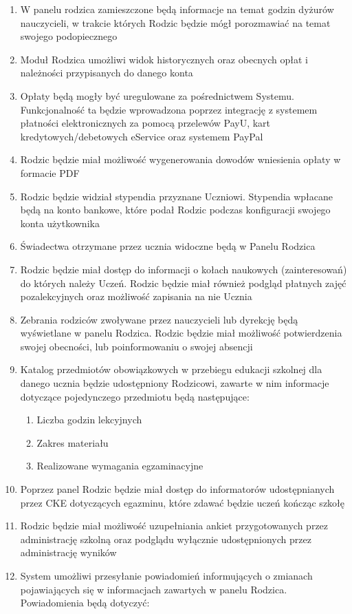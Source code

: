 \documentclass{article}
\begin{document}
\begin{enumerate}
	\item W panelu rodzica zamieszczone będą informacje na temat godzin dyżurów nauczycieli, w trakcie których Rodzic będzie mógł porozmawiać na temat swojego podopiecznego
	\item Moduł Rodzica umożliwi widok historycznych oraz obecnych opłat i należności przypisanych do danego konta
	\item Opłaty będą mogły być uregulowane za pośrednictwem Systemu. Funkcjonalność ta będzie wprowadzona poprzez integrację z systemem płatności elektronicznych za pomocą przelewów PayU, kart kredytowych/debetowych eService oraz systemem PayPal
	\item Rodzic będzie miał możliwość wygenerowania dowodów wniesienia opłaty w formacie PDF
	\item Rodzic będzie widział stypendia przyznane Uczniowi. Stypendia wpłacane będą na konto bankowe, które podał Rodzic podczas konfiguracji swojego konta użytkownika
	\item Świadectwa otrzymane przez ucznia widoczne będą w Panelu Rodzica
	\item Rodzic będzie miał dostęp do informacji o kołach naukowych (zainteresowań) do których należy Uczeń. Rodzic będzie miał również podgląd płatnych zajęć pozalekcyjnych oraz możliwość zapisania na nie Ucznia
	\item Zebrania rodziców zwoływane przez nauczycieli lub dyrekcję będą wyświetlane w panelu Rodzica.  Rodzic będzie miał możliwość potwierdzenia swojej obecności, lub poinformowaniu o swojej absencji
	\item Katalog przedmiotów obowiązkowych w przebiegu edukacji szkolnej dla danego ucznia będzie udostępniony Rodzicowi, zawarte w nim informacje dotyczące pojedynczego przedmiotu będą następujące:
	\begin{enumerate}
		\item Liczba godzin lekcyjnych
		\item Zakres materiału
		\item Realizowane wymagania egzaminacyjne 
	\end{enumerate}
	\item Poprzez panel Rodzic będzie miał dostęp do informatorów udostępnianych przez CKE dotyczących egazminu, które zdawać będzie uczeń kończąc szkołę 
	\item Rodzic będzie miał możliwość uzupełniania ankiet przygotowanych przez administrację szkolną oraz podglądu wyłącznie udostępnionych przez administrację wyników
	\item System umożliwi przesyłanie powiadomień informujących o zmianach pojawiających się w informacjach zawartych w panelu Rodzica. Powiadomienia będą dotyczyć:

\end{enumerate}
\end{document}
